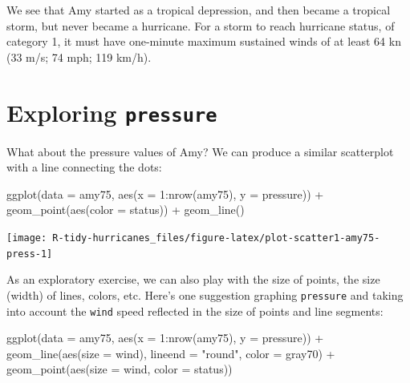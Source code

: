 \documentclass[
]{book}
\newenvironment{Shaded}{\begin{snugshade}}{\end{snugshade}}
\newcommand{\AttributeTok}[1]{\textcolor[rgb]{0.77,0.63,0.00}{#1}}
\newcommand{\DecValTok}[1]{\textcolor[rgb]{0.00,0.00,0.81}{#1}}
\newcommand{\FunctionTok}[1]{\textcolor[rgb]{0.00,0.00,0.00}{#1}}
\newcommand{\NormalTok}[1]{#1}
\newcommand{\SpecialCharTok}[1]{\textcolor[rgb]{0.00,0.00,0.00}{#1}}
\newcommand{\StringTok}[1]{\textcolor[rgb]{0.31,0.60,0.02}{#1}}
\begin{document}
We see that Amy started as a tropical depression, and then became a tropical
storm, but never became a hurricane. For a storm to reach hurricane status, of category 1, it must have one-minute maximum sustained winds of at least 64 kn
(33 m/s; 74 mph; 119 km/h).

\hypertarget{exploring-pressure}{%
\section{\texorpdfstring{Exploring \texttt{pressure}}{Exploring pressure}}\label{exploring-pressure}}

What about the pressure values of Amy? We can produce a similar scatterplot
with a line connecting the dots:

\begin{Shaded}
\begin{Highlighting}[]
\FunctionTok{ggplot}\NormalTok{(}\AttributeTok{data =}\NormalTok{ amy75, }\FunctionTok{aes}\NormalTok{(}\AttributeTok{x =} \DecValTok{1}\SpecialCharTok{:}\FunctionTok{nrow}\NormalTok{(amy75), }\AttributeTok{y =}\NormalTok{ pressure)) }\SpecialCharTok{+}
  \FunctionTok{geom\_point}\NormalTok{(}\FunctionTok{aes}\NormalTok{(}\AttributeTok{color =}\NormalTok{ status)) }\SpecialCharTok{+} 
  \FunctionTok{geom\_line}\NormalTok{()}
\end{Highlighting}
\end{Shaded}

\begin{center}\texttt{[image: R-tidy-hurricanes\_files/figure-latex/plot-scatter1-amy75-press-1]} \end{center}

As an exploratory exercise, we can also play with the size of points, the
size (width) of lines, colors, etc. Here's one suggestion graphing \texttt{pressure}
and taking into account the \texttt{wind} speed reflected in the size of points and
line segments:

\begin{Shaded}
\begin{Highlighting}[]
\FunctionTok{ggplot}\NormalTok{(}\AttributeTok{data =}\NormalTok{ amy75, }\FunctionTok{aes}\NormalTok{(}\AttributeTok{x =} \DecValTok{1}\SpecialCharTok{:}\FunctionTok{nrow}\NormalTok{(amy75), }\AttributeTok{y =}\NormalTok{ pressure)) }\SpecialCharTok{+}
  \FunctionTok{geom\_line}\NormalTok{(}\FunctionTok{aes}\NormalTok{(}\AttributeTok{size =}\NormalTok{ wind), }\AttributeTok{lineend =} \StringTok{"round"}\NormalTok{, }\AttributeTok{color =} \StringTok{\textquotesingle{}gray70\textquotesingle{}}\NormalTok{) }\SpecialCharTok{+}
  \FunctionTok{geom\_point}\NormalTok{(}\FunctionTok{aes}\NormalTok{(}\AttributeTok{size =}\NormalTok{ wind, }\AttributeTok{color =}\NormalTok{ status))}
\end{Highlighting}
\end{Shaded}
\end{document}
